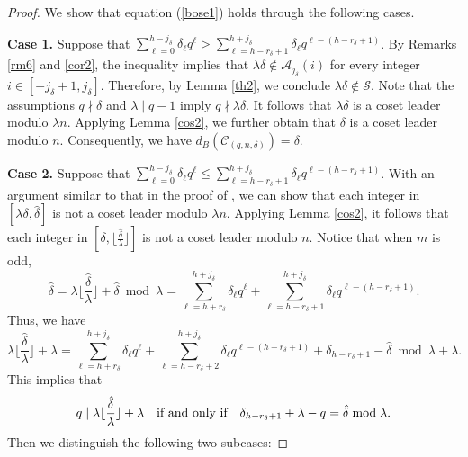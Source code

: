 \documentclass[journal,onecolumn]{IEEEtran}
\begin{document}
\begin{proof}
We show that equation (\ref{bose1}) holds through the following cases. 

\textbf{Case 1.} Suppose that   $\sum\limits_{\ell=0}^{h-j_{\delta}} \delta_{\ell} q^{\ell} > \sum\limits_{\ell=h - r_{\delta} + 1}^{h + j_{\delta}} \delta_{\ell} q^{\ell - (h - r_{\delta} + 1)}$. By Remarks \ref{rm6} and  \ref{cor2}, the inequality implies that   $\lambda \delta\not\in \mathcal{A}_{j_{\delta}}(i)$ for every integer $i\in [-j_{\delta}+1,j_{\delta}]$. Therefore,  by Lemma  \ref{th2}, we conclude  $\lambda\delta\not \in \mathcal{S}$. Note that the assumptions   $q\nmid\delta$ and $\lambda \mid q-1$ imply $q\nmid \lambda \delta$. It follows that   $\lambda \delta$ is a coset leader modulo $\lambda n$. Applying Lemma \ref{cos2}, we further obtain that   $\delta$ is  a coset leader modulo $n$. Consequently, we have $ d_B(\mathcal{C}_{(q,n,\delta)})=\delta$.

\textbf{Case 2.}
Suppose that $\sum\limits_{\ell=0}^{h-j_{\delta}} \delta_{\ell} q^{\ell} \leq \sum\limits_{\ell=h - r_{\delta} + 1}^{h + j_{\delta}} \delta_{\ell} q^{\ell - (h - r_{\delta} + 1)}$. With an argument similar to that in  the proof of \cite[Theorem 6]{zheng2025}, we can  show that each integer in $ [\lambda\delta, \hat{\delta}]$ is not  a coset leader modulo $\lambda n$.  Applying Lemma \ref{cos2}, it follows  that each integer in $\left[\delta, \lfloor \frac{\hat{\delta}}{\lambda}\rfloor \right]$ is not a coset leader modulo $n$. Notice  that when $m$ is odd,  \begin{equation*}
    \hat{\delta}=\lambda \lfloor\frac{\hat{\delta}}{\lambda} \rfloor+\hat{\delta}\bmod \lambda= \sum\limits_{\ell = h + r_{\delta}}^{h + j_{\delta}} \delta_{\ell} q^{\ell} + \sum\limits_{\ell =h - r_{\delta}+1}^{h + j_{\delta}} \delta_{\ell} q^{\ell - ( h- r_{\delta}+1)}.\end{equation*} Thus, we have 
\begin{equation*}
    \lambda \lfloor\frac{\hat{\delta}}{\lambda} \rfloor+ \lambda = \sum\limits_{\ell = h + r_{\delta}}^{h + j_{\delta}} \delta_{\ell} q^{\ell} + \sum\limits_{\ell = h - r_{\delta}+2}^{h + j_{\delta}} \delta_{\ell} q^{\ell - (h - r_{\delta}+1)} +\delta_{h-r_{\delta}+1}-\hat{\delta}\bmod \lambda+\lambda.
\end{equation*}
This implies that \begin{equation*}
    q\mid  \lambda \lfloor\frac{\hat{\delta}}{\lambda} \rfloor+ \lambda\quad  \hbox{if and only if}\quad  
 \delta_{h-r_{\delta}+1}+\lambda-q=\hat{\delta} \bmod \lambda.\end{equation*}  
Then we distinguish the following two subcases: 


\end{proof}
\end{document}
